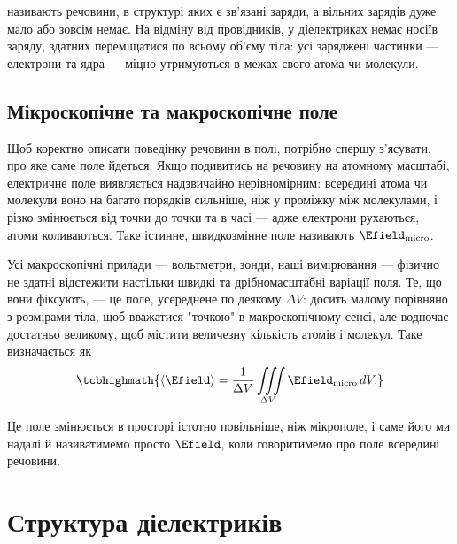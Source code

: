 \begin{Attention}
	 називають речовини, в структурі яких є зв'язані заряди, а вільних зарядів дуже мало або зовсім немає. На відміну від
	провідників, у діелектриках немає носіїв заряду, здатних переміщатися по всьому об'єму тіла: усі заряджені частинки --- електрони та ядра ---
	міцно утримуються в межах свого атома чи молекули.
\end{Attention}

\subsection*{Мікроскопічне та макроскопічне поле}

Щоб коректно описати поведінку речовини в полі, потрібно спершу з'ясувати, про яке саме поле йдеться. Якщо подивитись на речовину на атомному
масштабі, електричне поле виявляється надзвичайно нерівномірним: всередині атома чи молекули воно на багато порядків сильніше, ніж у проміжку між
молекулами, і різко змінюється від точки до точки та в часі --- адже електрони рухаються, атоми коливаються. Таке істинне, швидкозмінне поле
називають  $\Efield_\text{micro}$.

Усі макроскопічні прилади --- вольтметри, зонди, наші вимірювання --- фізично не здатні відстежити настільки швидкі та дрібномасштабні варіації поля.
Те, що вони фіксують, --- це поле, усереднене по деякому  $\Delta V$: досить малому порівняно з розмірами
тіла, щоб вважатися "точкою" в макроскопічному сенсі, але водночас достатньо великому, щоб містити величезну кількість атомів і молекул. Таке
 визначається як
\begin{equation}\label{eq:AvgField}
	\tcbhighmath{
		\left\langle \Efield\right\rangle = \frac1{\Delta V} \iiint\limits_{\Delta V} \Efield_\text{micro}\, dV.
	}
\end{equation}

Це поле змінюється в просторі істотно повільніше, ніж мікрополе, і саме його ми надалі й називатимемо просто $\Efield$, коли говоритимемо про поле
всередині речовини.

\section{Структура діелектриків}

